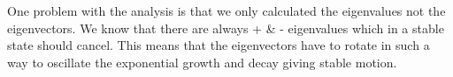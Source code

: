One problem with the analysis is that we only calculated the eigenvalues not the eigenvectors. We know that there are always + \& - eigenvalues which in a stable state should cancel. This means that the eigenvectors have to rotate in such a way to oscillate the exponential growth and decay giving stable motion.




